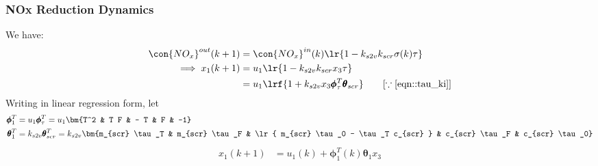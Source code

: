 \subsubsection{NOx Reduction Dynamics}
We have:
\begin{align*}
    \con{NO_x}^{out} (k + 1) &= \con{NO_x}^{in} (k) \lr{1 - k_{s2v} k_{scr} \sigma(k) \tau}\\
    \implies x_1 (k+1) &= u_1 \lr{1 - k_{s2v} k_{scr} x_3 \tau}\\
                       &= u_1 \lrf{1 + k_{s2v} x_3 \pmb \phi_\tau^T \pmb \theta_{scr}} \qquad [\because \ref{eqn::tau_ki}]
\end{align*}
Writing in linear regression form, let
\begin{align*}
    \pmb \phi_1^T &= u_1 \pmb \phi_\tau^T = u_1 \bm{T^2 &  T F & - T &  F & -1} \\
    \pmb \theta_1^T &= k_{s2v} \pmb \theta_{scr}^T = k_{s2v} \bm{m_{scr} \tau_T &
                                                               m_{scr} \tau_F &
                                                               \lr{ m_{scr} \tau_0  -  \tau_T c_{scr} } &
                                                               c_{scr} \tau_F &
                                                               c_{scr} \tau_0}
\end{align*}
\begin{align}
    x_1(k+1) &= u_1(k) + \pmb \phi_1^T (k) \pmb \theta_1 x_3
\end{align}















